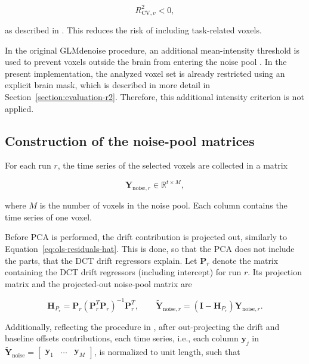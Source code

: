 \documentclass[english]{pwr_wmat_praca_dyplomowa}
\theoremstyle{definition}
\theoremstyle{remark}
\begin{document}
\begin{equation}
    R^2_{\mathrm{CV},v} < 0,
\end{equation}

as described in \cite{glm-denoise}. This reduces the risk of including task-related voxels. 

In the original GLMdenoise procedure, an additional mean-intensity threshold is used to prevent voxels outside the brain from entering the noise pool \cite{glm-denoise}. In the present implementation, the analyzed voxel set is already restricted using an explicit brain mask, which is described in more detail in Section~\ref{section:evaluation-r2}. Therefore, this additional intensity criterion is not applied.

\subsection{Construction of the noise-pool matrices}

For each run $r$, the time series of the selected voxels are collected in a matrix

\begin{equation}
    \mathbf{Y}_{\mathrm{noise},r} \in \mathbb{R}^{t \times M},
\end{equation}

where $M$ is the number of voxels in the noise pool. Each column contains the time series of one voxel.

\newpage
Before PCA is performed, the drift contribution is projected out, similarly to Equation~\eqref{eq:ols-residuals-hat}. This is done, so that the PCA does not include the parts, that the DCT drift regressors explain. Let $\mathbf{P}_r$ denote the matrix containing the DCT drift regressors (including intercept) for run $r$. Its projection matrix and the projected-out noise-pool matrix are

\begin{equation}
    \mathbf{H}_{P_r} = \mathbf{P}_r \left(\mathbf{P}_r^T\mathbf{P}_r\right)^{-1}\mathbf{P}_r^T, 
    \qquad 
    \widetilde{\mathbf{Y}}_{\mathrm{noise},r} = \left(\mathbf{I} - \mathbf{H}_{P_r}\right) \mathbf{Y}_{\mathrm{noise},r}.
\end{equation}

Additionally, reflecting the procedure in \cite{glm-denoise}, after out-projecting the drift and baseline offsets contributions, each time series, i.e., each column $\mathbf{y}_j$ in $\widetilde{\mathbf{Y}}_{\mathrm{noise}} = \begin{bmatrix}\mathbf{y}_1 & \ldots &  \mathbf{y}_M\end{bmatrix}$, 
is normalized to unit length, such that
\end{document}
